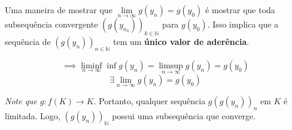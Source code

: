 \documentclass[12pt]{article}
\begin{document}
    Uma maneira de mostrar que $\lim \limits_{n \to \infty} g(y_n) = g(y_0)$ é mostrar que toda subsequência convergente $\left(g(y_{n_k}) \right)_{k \in \mathbb{N}}$ para $g(y_0)$. Isso implica que a sequência de $\left( g(y_n)\right)_{n \in \mathbb{N}}$ tem um \textbf{único valor de aderência}.

    \begin{equation*}
        \implies \liminf \limits_{n \to \infty} \inf g(y_n) = \limsup \limits_{n \to \infty} g(y_n) = g(y_0)
    \end{equation*}
    \begin{equation*}
        \exists \lim \limits_{n \to \infty} g(y_n) = g(y_0)
    \end{equation*}

    \textit{Note que }$g: f(K) \to K$. Portanto, qualquer sequência $g\left(g(y_n)\right)_n$ em $K$ é limitada. Logo, $\left(g(y_n)\right)_\mathbb{N}$ possui uma subsequência que converge.
\end{document}
